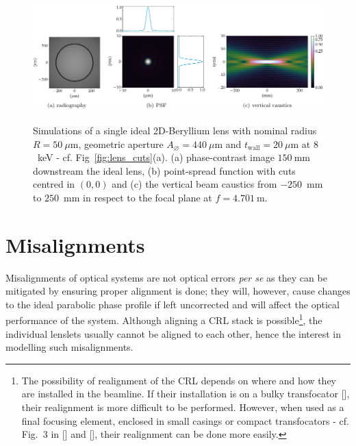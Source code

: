 \begin{refsection}
 \begin{figure}[hp]
        \centering
        {\includegraphics[height=4.19cm]{figures/ch04/CRL_ideal.pdf}}
        \caption[The ideal single X-ray lens]{Simulations of a single ideal 2D-Beryllium lens with nominal radius $R=50~\mu\text{m}$, geometric aperture $A_{\diameter}=440~\mu\text{m}$ and $t_\text{wall}=20~\mu$m at $8$~keV  - cf. Fig~\ref{fig:lens_cuts}(a). (a) phase-contrast image $150~$mm downstream the ideal lens, (b) point-spread function with cuts centred in $(0,0)$ and (c) the vertical beam caustics from $-250$~mm to $250$~mm in respect to the focal plane at $f=4.701~$m.} \label{fig:ideal_CRL}
\end{figure}

\clearpage

\section{Misalignments}\label{sec:misalignments}

Misalignments of optical systems are not optical errors \textit{per se} as they can be mitigated by ensuring proper alignment is done; they will, however, cause changes to the ideal parabolic phase profile if left uncorrected and will affect the optical performance of the system. Although aligning a CRL stack is possible\footnote{The possibility of realignment of the CRL depends on where and how they are installed in the beamline. If their installation is on a bulky transfocator [\cite{Vaughan2011}], their realignment is more difficult to be performed. However, when used as a final focusing element, enclosed in small casings or compact transfocators - cf. Fig.~3 in [\cite{Lengeler1999}] and [\cite{Kornemann2017, Narikovich2019}], their realignment can be done more easily.}, the individual lenslets usually cannot be aligned to each other, hence the interest in modelling such misalignments.


\end{refsection}
